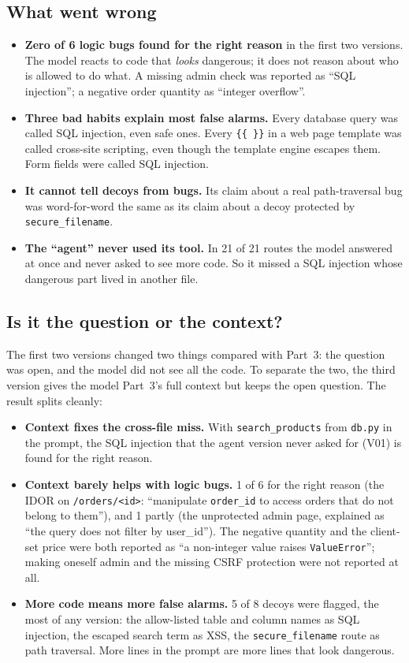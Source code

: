 \documentclass[11pt,a4paper]{article}
\newcommand{\code}[1]{\texttt{#1}}
\begin{document}
\subsection{What went wrong}
\begin{itemize}
  \item \textbf{Zero of 6 logic bugs found for the right reason} in the first two versions. The model reacts to code that \emph{looks}
        dangerous; it does not reason about who is allowed to do what. A missing admin check was reported as
        ``SQL injection''; a negative order quantity as ``integer overflow''.
  \item \textbf{Three bad habits explain most false alarms.} Every database query was called SQL injection,
        even safe ones. Every \code{\{\{ \}\}} in a web page template was called cross-site scripting, even
        though the template engine escapes them. Form fields were called SQL injection.
  \item \textbf{It cannot tell decoys from bugs.} Its claim about a real path-traversal bug was word-for-word
        the same as its claim about a decoy protected by \code{secure\_filename}.
  \item \textbf{The ``agent'' never used its tool.} In 21 of 21 routes the model answered at once and never
        asked to see more code. So it missed a SQL injection whose dangerous part lived in another file.
\end{itemize}

\subsection{Is it the question or the context?}
The first two versions changed two things compared with Part~3: the question was open, and the model did not see
all the code. To separate the two, the third version gives the model Part~3's full context but keeps the open
question. The result splits cleanly:

\begin{itemize}
  \item \textbf{Context fixes the cross-file miss.} With \code{search\_products} from \code{db.py} in the prompt, the
        SQL injection that the agent version never asked for (V01) is found for the right reason.
  \item \textbf{Context barely helps with logic bugs.} 1 of 6 for the right reason (the IDOR on
        \code{/orders/<id>}: ``manipulate \code{order\_id} to access orders that do not belong to them''), and 1
        partly (the unprotected admin page, explained as ``the query does not filter by user\_id''). The negative
        quantity and the client-set price were both reported as ``a non-integer value raises \code{ValueError}'';
        making oneself admin and the missing CSRF protection were not reported at all.
  \item \textbf{More code means more false alarms.} 5 of 8 decoys were flagged, the most of any version: the
        allow-listed table and column names as SQL injection, the escaped search term as XSS, the
        \code{secure\_filename} route as path traversal. More lines in the prompt are more lines that look
        dangerous.
\end{itemize}
\end{document}
